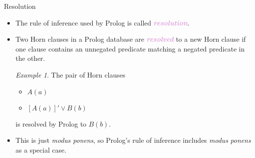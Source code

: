 \documentclass[xcolor=dvipsnames,9pt,handout,show notes]{beamer}
\newcommand{\join}{\ensuremath{\vee}}
\theoremstyle{definition}
\theoremstyle{remark}
\newtheorem*{ex}{Example}
\numberwithin{theorem}{section}
\numberwithin{claim}{section}
\numberwithin{equation}{section}
\numberwithin{conjecture}{section}
\newcommand{\defn}[1]{\textcolor{Plum}{\textit{\textbf{#1}}}}
\begin{document}
\begin{frame}{Resolution}
  \begin{itemize}
\item The rule of inference used by Prolog is called \defn{resolution}.\\[10pt]
\item<2->Two Horn clauses in a Prolog database are \defn{resolved} to a new
  Horn clause if one clause contains an unnegated predicate matching a negated
  predicate in the other.\\[10pt]
  \begin{ex} The pair of Horn clauses
  \begin{itemize}
  \item $A(a)$\\[5pt]
  \item $[A(a)]' \join B(b)$\\[5pt]
  \end{itemize}
  is resolved by Prolog to $B(b)$.\\[10pt]
  \end{ex}
\item <3->This is just \emph{modus ponens}, so Prolog's rule of inference
  includes \emph{modus ponens} as a special case.
\end{itemize}
\end{frame}
\end{document}
